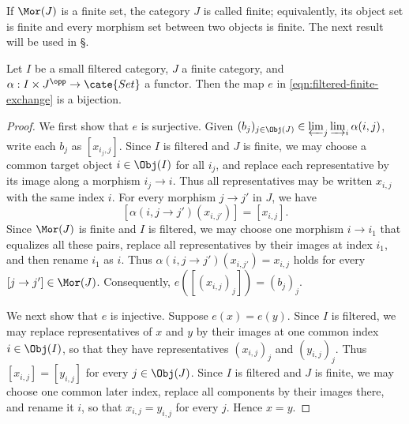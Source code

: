 If $\Mor(J)$ is a finite set, the category $J$ is called finite; equivalently,
its object set is finite and every morphism set between two objects is finite.
The next result will be used in \S{}.

\begin{proposition}\label{prop:filtered-finite-exchange}
	Let $I$ be a small filtered category, $J$ a finite category, and
	$\alpha: I \times J^{\opp} \to \cate{Set}$ a functor. Then the map $e$ in
	\eqref{eqn:filtered-finite-exchange} is a bijection.
\end{proposition}
\begin{proof}
	We first show that $e$ is surjective. Given
	$(b_j)_{j \in \Obj(J)} \in \varprojlim_j \varinjlim_i \alpha(i, j)$, write
	each $b_j$ as $[x_{i_j, j}]$. Since $I$ is filtered and $J$ is finite, we
	may choose a common target object $i\in\Obj(I)$ for all $i_j$, and replace
	each representative by its image along a morphism $i_j\to i$. Thus all
	representatives may be written $x_{i,j}$ with the same index $i$. For every
	morphism $j \to j'$ in $J$, we have
	\[ \left[ \alpha(i, j \to j') (x_{i, j'}) \right] = \left[ x_{i, j} \right]. \]
	Since $\Mor(J)$ is finite and $I$ is filtered, we may choose one morphism
	$i\to i_1$ that equalizes all these pairs, replace all representatives by
	their images at index $i_1$, and then rename $i_1$ as $i$. Thus
	$\alpha(i, j \to j') (x_{i, j'}) = x_{i, j}$ holds for every
	$[j \to j'] \in \Mor(J)$. Consequently,
	$e\left( [(x_{i, j})_j] \right) = (b_j)_j$.

	We next show that $e$ is injective. Suppose $e(x) = e(y)$. Since $I$ is
	filtered, we may replace representatives of $x$ and $y$ by their images at
	one common index $i\in\Obj(I)$, so that they have representatives
	$(x_{i,j})_j$ and $(y_{i,j})_j$. Thus $[x_{i,j}]=[y_{i,j}]$ for every
	$j \in \Obj(J)$. Since $I$ is filtered and $J$ is finite, we may choose one
	common later index, replace all components by their images there, and rename
	it $i$, so that $x_{i,j}=y_{i,j}$ for every $j$. Hence $x=y$.
\end{proof}
